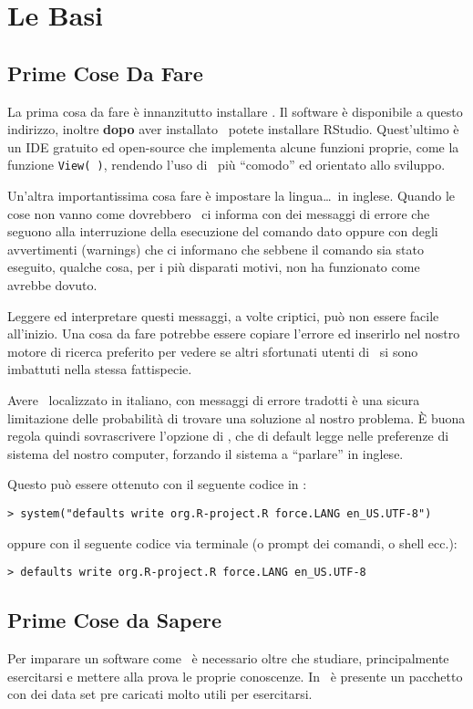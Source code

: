 \chapter{Le Basi}
\section{Prime Cose Da Fare}
La prima cosa da fare è innanzitutto installare \erre. Il software è disponibile a questo indirizzo, inoltre \textbf{dopo} aver installato \erre\ potete installare \textsf{RStudio}. Quest'ultimo è un \textsf{IDE} gratuito ed open-source che implementa alcune funzioni proprie, come la funzione \lstinline!View( )!, rendendo l'uso di \erre\ più ``comodo'' ed orientato allo sviluppo.

Un'altra importantissima cosa fare è impostare la lingua\dots\ in inglese.
Quando le cose non vanno come dovrebbero \erre\ ci informa con dei messaggi di errore che seguono alla interruzione della esecuzione del comando dato oppure con degli avvertimenti (warnings) che ci informano che sebbene il comando sia stato eseguito, qualche cosa, per i più disparati motivi, non ha funzionato come avrebbe dovuto.

Leggere ed interpretare questi messaggi, a volte criptici, può non essere facile all'inizio. Una cosa da fare potrebbe essere copiare l'errore ed inserirlo nel nostro motore di ricerca preferito per vedere se altri sfortunati utenti di \erre\ si sono imbattuti nella stessa fattispecie.

Avere \erre\ localizzato in italiano, con messaggi di errore tradotti è una sicura limitazione delle probabilità di trovare una soluzione al nostro problema. È buona regola quindi sovrascrivere l'opzione di \erre, che di default legge nelle preferenze di sistema del nostro computer, forzando il sistema a ``parlare'' in inglese.

Questo può essere ottenuto con il seguente codice in \erre:
\begin{lstlisting}
> system("defaults write org.R-project.R force.LANG en_US.UTF-8")
\end{lstlisting}
oppure con il seguente codice via terminale (o prompt dei comandi, o shell ecc.):
\begin{lstlisting}
> defaults write org.R-project.R force.LANG en_US.UTF-8
\end{lstlisting}

\section{Prime Cose da Sapere}
Per imparare un software come \erre\ è necessario oltre che studiare, principalmente esercitarsi e mettere alla prova le proprie conoscenze. In \erre\ è presente un pacchetto con dei data set pre caricati molto utili per esercitarsi.

